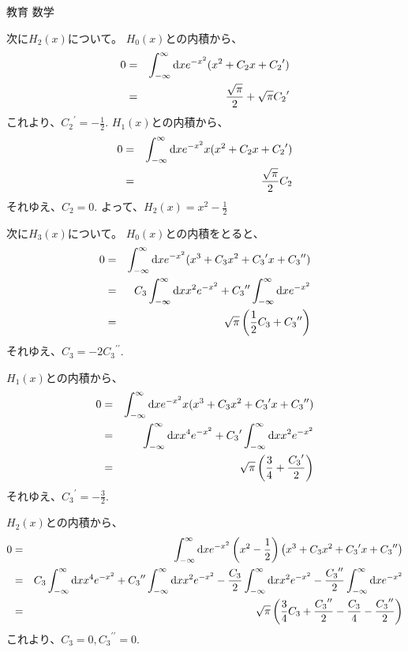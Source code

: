 \documentclass[fleqn]{jbook}
\begin{document}
\begin{answer}{教育 数学}{}
\begin{subanswers}
\begin{subsubanswers}
次に$H_2(x)$について。
$H_0(x)$との内積から、
\begin{eqnarray*}
0 &=& \int_{-\infty}^{\infty} {\rm d}x e^{- x^2} (x^2 + C_2 x + {C_2}^\prime) \\
&=& \frac{\sqrt{\pi}}{2} + \sqrt{\pi}{C_2}^\prime
\end{eqnarray*}
これより、${C_2}^\prime = -\displaystyle{\frac{1}{2}}.$
$H_1(x)$との内積から、
\begin{eqnarray*}
0 &=& \int_{-\infty}^{\infty} {\rm d}x e^{- x^2} x (x^2 + C_2 x + {C_2}^\prime) \\
&=& \frac{\sqrt{\pi}}{2} C_2
\end{eqnarray*}
それゆえ、$C_2 = 0.$
よって、$H_2(x) = x^2 - \displaystyle{\frac{1}{2}}$

次に$H_3(x)$について。
$H_0(x)$との内積をとると、
\begin{eqnarray*}
0 &=& \int_{-\infty}^{\infty} {\rm d}x e^{- x^2} (x^3 + C_3 x^2 + {C_3}^\prime
x + {C_3}^{\prime \prime} ) \\
&=& C_3 \int_{-\infty}^{\infty} {\rm d}x x^2 e^{- x^2} + {C_3}^{\prime \prime}
\int_{-\infty}^{\infty} {\rm d}x e^{- x^2} \\
&=& \sqrt{\pi} \left( \frac{1}{2} C_3 + {C_3}^{\prime \prime} \right)
\end{eqnarray*}
それゆえ、$C_3 = -2{C_3}^{\prime \prime}.$

$H_1(x)$との内積から、
\begin{eqnarray*}
0 &=& \int_{-\infty}^{\infty} {\rm d}x e^{- x^2} x (
x^3 + C_3 x^2 + {C_3}^\prime x + {C_3}^{\prime \prime}) \\
&=& \int_{-\infty}^{\infty} {\rm d}x x^4 e^{- x^2}+ {C_3}^\prime 
\int_{-\infty}^{\infty} {\rm d}x x^2 e^{- x^2} \\
&=& \sqrt{\pi} \left( \frac{3}{4} + \frac{{C_3}^\prime}{2} \right)
\end{eqnarray*}
それゆえ、${C_3}^\prime = -\displaystyle{\frac{3}{2}}.$

$H_2(x)$との内積から、
\begin{eqnarray*}
0 &=& \int_{-\infty}^{\infty} {\rm d}x e^{- x^2} \left( x^2 - \frac{1}{2} \right)
\left( x^3 + C_3 x^2 + {C_3}^\prime x + {C_3}^{\prime \prime} \right) \\
&=& C_3 \int_{-\infty}^{\infty} {\rm d}x x^4 e^{- x^2} + {C_3}^{\prime \prime}
\int_{-\infty}^{\infty} {\rm d}x x^2 e^{- x^2} - \frac{C_3}{2} 
\int_{-\infty}^{\infty} {\rm d}x x^2 e^{- x^2} - \frac{{C_3}^{\prime \prime}}{2}
\int_{-\infty}^{\infty} {\rm d}x e^{- x^2} \\
&=& \sqrt{\pi} \left( \frac{3}{4} C_3 + \frac{{C_3}^{\prime \prime}}{2} 
- \frac{C_3}{4} - \frac{{C_3}^{\prime \prime}}{2} \right)
\end{eqnarray*}
これより、$C_3 = 0, {C_3}^{\prime \prime}=0.$


\end{subsubanswers}
\end{subanswers}
\end{answer}
\end{document}
